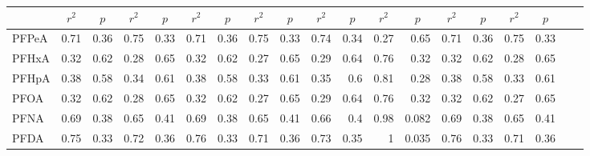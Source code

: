 \begin{table}
{\begin{tabular}{lrrrrrrrrrrrrrrrrrr}
 & \multicolumn{1}{c}{$r^2$} & \multicolumn{1}{c}{$p$} & \multicolumn{1}{c}{$r^2$} & \multicolumn{1}{c}{$p$} & \multicolumn{1}{c}{$r^2$} & \multicolumn{1}{c}{$p$} & \multicolumn{1}{c}{$r^2$} & \multicolumn{1}{c}{$p$} & \multicolumn{1}{c}{$r^2$} & \multicolumn{1}{c}{$p$} & \multicolumn{1}{c}{$r^2$} & \multicolumn{1}{c}{$p$} & \multicolumn{1}{c}{$r^2$} & \multicolumn{1}{c}{$p$} & \multicolumn{1}{c}{$r^2$} & \multicolumn{1}{c}{$p$} &  &  \\ \midrule
PFPeA & 0.71 & 0.36 & 0.75 & 0.33 & 0.71 & 0.36 & 0.75 & 0.33 & 0.74 & 0.34 & 0.27 & 0.65 & 0.71 & 0.36 & 0.75 & 0.33 &  &  \\
PFHxA & 0.32 & 0.62 & 0.28 & 0.65 & 0.32 & 0.62 & 0.27 & 0.65 & 0.29 & 0.64 & 0.76 & 0.32 & 0.32 & 0.62 & 0.28 & 0.65 &  &  \\
PFHpA & 0.38 & 0.58 & 0.34 & 0.61 & 0.38 & 0.58 & 0.33 & 0.61 & 0.35 & 0.6 & 0.81 & 0.28 & 0.38 & 0.58 & 0.33 & 0.61 &  &  \\
PFOA & 0.32 & 0.62 & 0.28 & 0.65 & 0.32 & 0.62 & 0.27 & 0.65 & 0.29 & 0.64 & 0.76 & 0.32 & 0.32 & 0.62 & 0.27 & 0.65 &  &  \\
PFNA & 0.69 & 0.38 & 0.65 & 0.41 & 0.69 & 0.38 & 0.65 & 0.41 & 0.66 & 0.4 & 0.98 & 0.082 & 0.69 & 0.38 & 0.65 & 0.41 &  &  \\
PFDA & 0.75 & 0.33 & 0.72 & 0.36 & 0.76 & 0.33 & 0.71 & 0.36 & 0.73 & 0.35 & 1 & 0.035 & 0.76 & 0.33 & 0.71 & 0.36 &  & \\ \bottomrule
\end{tabular}}
\end{table}

